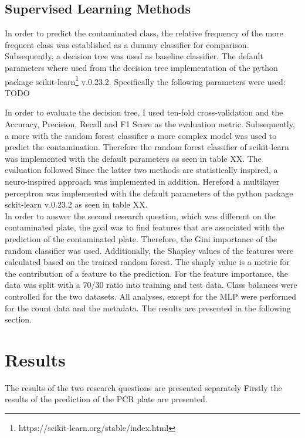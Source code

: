 \documentclass{svproc}
\begin{document}
\subsection{Supervised Learning Methods}
In order to predict the contaminated class, the relative frequency of the more frequent class was established as a dummy classifier for comparison. Subsequently, a decision tree was used as baseline classifier. The default parameters where used from the decision tree implementation of the python package scikit-learn\footnote{https://scikit-learn.org/stable/index.html} v.0.23.2. Specifically the following parameters were used: TODO

In order to evaluate the decision tree, I used ten-fold cross-validation and the Accuracy, Precision, Recall and F1 Score as the evaluation metric.
Subsequently, a more with the random forest classifier a more complex model was used to predict the contamination. Therefore the random forest classifier of scikit-learn was implemented with the default parameters as seen in table XX. The evaluation followed
Since the latter two methods are statistically inspired, a neuro-inspired approach was implemented in addition. Hereford a multilayer perceptron was implemented with the default parameters of the python package sckit-learn v.0.23.2 as seen in table XX.\\


In order to answer the second research question, which was different on the contaminated plate, the goal was to find features that are associated with the prediction of the contaminated plate. Therefore, the Gini importance of the random classifier was used. Additionally, the Shapley values of the features were calculated based on the trained random forest. The shaply value is a metric for the contribution of a feature to the prediction. For the feature importance, the data was split with a 70/30 ratio into training and test data. Class balances were controlled for the two datasets. All analyses, except for the MLP were performed for the count data and the metadata. The results are presented in the following section.
\section{Results}
The results of the two research questions are presented separately Firstly the results of the prediction of the PCR plate are presented.
\end{document}
